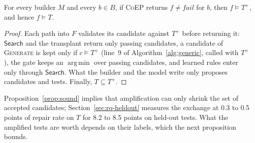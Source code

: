\documentclass[acmsmall,screen,review,anonymous,nonacm]{acmart}
\DeclareMathOperator*{\argmin}{arg\,min}
\newcommand{\tool}{\textsc{CoEP}\xspace}
\newcommand{\Fn}[1]{\textsc{#1}}
\newcommand{\aux}[1]{\ensuremath{\mathsf{#1}}}
\newcommand{\V}[1]{\ensuremath{\mathit{#1}}}
\begin{document}
\begin{proposition}\label{prop:sound}
For every builder $M$ and every $b \in B$, if \tool returns $f \neq \V{fail}$ for $b$, then $f \models T^{+}$, and hence $f \models T$.
\end{proposition}
\begin{proof}
Each path into $F$ validates its candidate against $T^{+}$ before returning it: \aux{Search} and the transplant return only passing candidates, a candidate of \Fn{Generate} is kept only if $c \models T^{+}$ (line~9 of Algorithm~\ref{alg:generic}, called with $T^{+}$), the gate keeps an $\argmin$ over passing candidates, and learned rules enter only through \aux{Search}. What the builder and the model write only proposes candidates and tests. Finally, $T \subseteq T^{+}$.
\end{proof}

Proposition~\ref{prop:sound} implies that amplification can only shrink the set of accepted candidates; Section~\ref{sec:rq-heldout} measures the exchange at 0.3 to 0.5 points of repair rate on $T$ for 8.2 to 8.5 points on held-out tests. What the amplified tests are worth depends on their labels, which the next proposition bounds.
\end{document}
